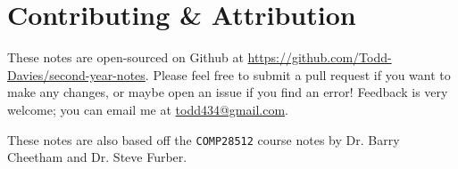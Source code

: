 \section*{Contributing \& Attribution}

These notes are open-sourced on Github at
\url{https://github.com/Todd-Davies/second-year-notes}. Please feel free to
submit a pull request if you want to make any changes, or maybe open an issue
if you find an error! Feedback is very welcome; you can email me at
\href{mailto:todd434@gmail.com}{todd434@gmail.com}.

These notes are also based off the \texttt{COMP28512} course notes by Dr. Barry
Cheetham and Dr. Steve Furber.
